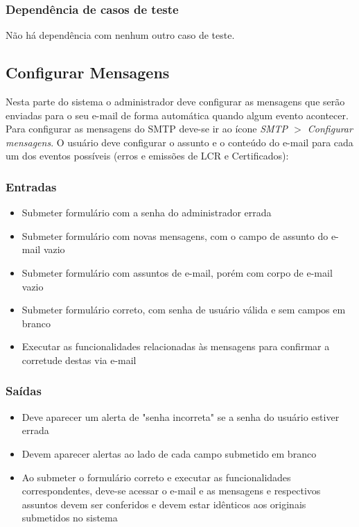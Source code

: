 \subsubsection{Dependência de casos de teste}
Não há dependência com nenhum outro caso de teste.

\subsection{Configurar Mensagens}

Nesta parte do sistema o administrador deve configurar as mensagens que serão enviadas para o seu e-mail de forma automática quando algum evento acontecer. Para configurar as mensagens do SMTP deve-se ir ao ícone \textit{SMTP $>$ Configurar mensagens}. O usuário deve configurar o assunto e o conteúdo do e-mail para cada um dos eventos possíveis (erros e emissões de LCR e Certificados):

\subsubsection{Entradas}
\begin{itemize}
	\item Submeter formulário com a senha do administrador errada
	\item Submeter formulário com novas mensagens, com o campo de assunto do e-mail vazio
	\item Submeter formulário com assuntos de e-mail, porém com corpo de e-mail vazio
	\item Submeter formulário correto, com senha de usuário válida e sem campos em branco
	\item Executar as funcionalidades relacionadas às mensagens para confirmar a corretude destas via e-mail
\end{itemize}

\subsubsection{Saídas}
\begin{itemize}
    \item Deve aparecer um alerta de "senha incorreta" se a senha do usuário estiver errada
    \item Devem aparecer alertas ao lado de cada campo submetido em branco
	\item Ao submeter o formulário correto e executar as funcionalidades correspondentes, deve-se acessar o e-mail e as mensagens e respectivos assuntos devem ser conferidos e devem estar idênticos aos originais submetidos no sistema
\end{itemize}

